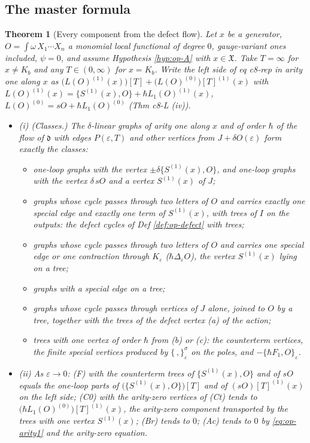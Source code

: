 \documentclass[11pt]{article}
\numberwithin{equation}{section}
\theoremstyle{plain}
\newtheorem{theorem}{Theorem}[section]
\theoremstyle{definition}
\begin{document}
\subsection{The master formula}

\begin{theorem}[Every component from the defect flow]
\label{thm:op-master}
Let $x$ be a generator, $O=\int\omega\,X_1\cdots X_n$ a monomial local functional of degree $0$, gauge-variant ones included, $\psi=0$, and assume Hypothesis \ref{hyp:op-A} with $x\in\mathfrak X$. Take $T=\infty$ for $x\ne K_b$ and any $T\in(0,\infty)$ for $x=K_b$. Write the left side of eq c8-rep in arity one along $x$ as $\big(L(O)^{(1)}(x)\big)[T]+\big(L(O)^{(0)}\big)[T]^{(1)}(x)$ with $L(O)^{(1)}(x)=\{S^{(1)}(x),O\}+\hbar L_1(O)^{(1)}(x)$, $L(O)^{(0)}=sO+\hbar L_1(O)^{(0)}$ (Thm c8-L (iv)).
\begin{itemize}
\item (i) (Classes.) The $\delta$-linear graphs of arity one along $x$ and of order $\hbar$ of the flow of $\mathfrak d$ with edges $P(\varepsilon,T)$ and other vertices from $J+\delta O(\varepsilon)$ form exactly the classes:
\begin{itemize}
\item[(F)] one-loop graphs with the vertex $\pm\delta\{S^{(1)}(x),O\}$, and one-loop graphs with the vertex $\delta\,sO$ and a vertex $S^{(1)}(x)$ of $J$;
\item[(C2)] graphs whose cycle passes through two letters of $O$ and carries exactly one special edge and exactly one term of $S^{(1)}(x)$, with trees of $I$ on the outputs: the defect cycles of Def \ref{def:op-defect} with trees;
\item[(C0)] graphs whose cycle passes through two letters of $O$ and carries one special edge or one contraction through $K_\varepsilon$ ($\hbar\Delta_\varepsilon O$), the vertex $S^{(1)}(x)$ lying on a tree;
\item[(Br)] graphs with a special edge on a tree;
\item[(Ac)] graphs whose cycle passes through vertices of $J$ alone, joined to $O$ by a tree, together with the trees of the defect vertex (a) of the action;
\item[(Ct)] trees with one vertex of order $\hbar$ from (b) or (c): the counterterm vertices, the finite special vertices produced by $\{\,,\}^\sigma_\varepsilon$ on the poles, and $-\{\hbar F_1,O\}_\varepsilon$.
\end{itemize}
\item (ii) As $\varepsilon\to0$: (F) with the counterterm trees of $\{S^{(1)}(x),O\}$ and of $sO$ equals the one-loop parts of $\big(\{S^{(1)}(x),O\}\big)[T]$ and of $(sO)[T]^{(1)}(x)$ on the left side; (C0) with the arity-zero vertices of (Ct) tends to $\big(\hbar L_1(O)^{(0)}\big)[T]^{(1)}(x)$, the arity-zero component transported by the trees with one vertex $S^{(1)}(x)$; (Br) tends to $0$; (Ac) tends to $0$ by \eqref{eq:op-arity1} and the arity-zero equation.

\end{itemize}
\end{theorem}
\end{document}
